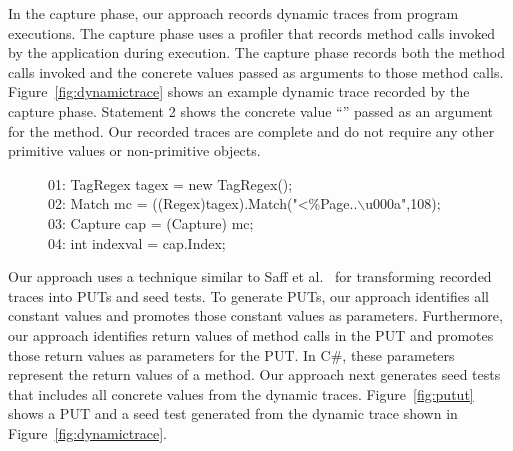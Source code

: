 In the capture phase, our approach records dynamic traces from program executions. The capture phase uses a profiler that records method calls invoked by the application during execution. The capture phase records both the method calls invoked and the concrete values passed as arguments to those method calls. Figure~\ref{fig:dynamictrace} shows
an example dynamic trace recorded by the capture phase. Statement 2 shows the concrete value ``'' passed as an argument for the  method. Our recorded traces are complete and do not require any other primitive values or non-primitive objects. 

\begin{figure}[t]
\begin{CodeOut}
01: TagRegex tagex = new TagRegex();\\
02: Match mc = ((Regex)tagex).Match("<\%\@ Page..$\backslash$u000a",108);\\
03: Capture cap = (Capture) mc;\\
04: int indexval = cap.Index;\\
\end{CodeOut}\vspace*{-3ex}
\vspace*{-1ex}
\end{figure}

Our approach uses a technique similar to Saff et al.~\cite{david:java} for transforming recorded traces into PUTs and seed tests. To generate PUTs, our approach identifies all constant values and promotes those constant values as parameters. Furthermore, our approach identifies return values of method calls in the PUT and promotes those return values as  parameters for the PUT. In C\#, these  parameters represent the return values of a method. Our approach next generates seed tests that includes all concrete values from the dynamic traces. Figure~\ref{fig:putut} shows a PUT and a seed test generated from the dynamic trace shown in Figure~\ref{fig:dynamictrace}.

